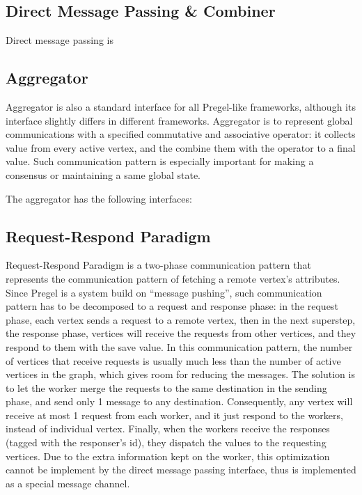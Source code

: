 \documentclass{sokendai_thesis} %
\begin{document}
\subsection{Direct Message Passing \& Combiner}

Direct message passing is 

\subsection{Aggregator}

Aggregator is also a standard interface for all Pregel-like frameworks, although its interface slightly differs in different frameworks.
Aggregator is to represent global communications with a specified commutative and associative operator: it collects value from every active vertex, and the combine them with the operator to a final value.
Such communication pattern is especially important for making a consensus or maintaining a same global state.

The aggregator has the following interfaces:

\subsection{Request-Respond Paradigm}

Request-Respond Paradigm \cite{effective} is a two-phase communication pattern that represents the communication pattern of fetching a remote vertex's attributes.
Since Pregel is a system build on ``message pushing'', such communication pattern has to be decomposed to a request and response phase:
in the request phase, each vertex sends a request to a remote vertex, then in the next superstep, the response phase, vertices will receive the requests from other vertices, and they respond to them with the save value.
In this communication pattern, the number of vertices that receive requests is usually much less than the number of active vertices in the graph, which gives room for reducing the messages.
The solution is to let the worker merge the requests to the same destination in the sending phase, and send only 1 message to any destination.
Consequently, any vertex will receive at most 1 request from each worker, and it just respond to the workers, instead of individual vertex.
Finally, when the workers receive the responses (tagged with the responser's id), they dispatch the values to the requesting vertices.
Due to the extra information kept on the worker, this optimization cannot be implement by the direct message passing interface, thus is implemented as a special message channel.
\end{document}
